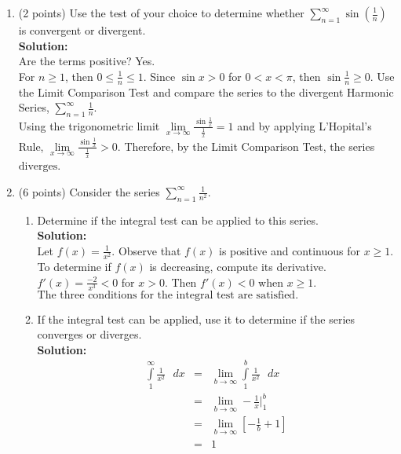\documentclass[paper=a4, fontsize=11pt]{scrartcl} %
\numberwithin{equation}{section} %
\numberwithin{figure}{section} %
\numberwithin{table}{section} %
\begin{document}
\begin{enumerate}
\item (2 points) Use the test of your choice to determine whether 
$\sum\limits_{n=1}^\infty \sin \left( \frac{1}{n} \right)$ is convergent or divergent.\\
\noindent\textbf{Solution:}\\
Are the terms positive? Yes.\\
For $n \ge 1$, then $0 \le \frac{1}{n} \le 1$.  Since $\sin x > 0$ for $0 < x < \pi$, then $\sin \frac{1}{n} \ge 0$. Use the Limit Comparison Test and compare the series to the divergent Harmonic Series, $\sum\limits_{n=1}^\infty \frac{1}{n}$. \\

Using the trigonometric limit $\lim\limits_{x \rightarrow \infty} \frac{\sin \frac{1}{x}}{\frac{1}{x}}=1$ and by applying L'Hopital's Rule,  $\lim\limits_{x \rightarrow \infty} \frac{\sin \frac{1}{x}}{\frac{1}{x}}>0$. Therefore, by the Limit Comparison Test, the series $\boxed{ \text{diverges}}$.


\newpage

\item (6 points) Consider the series $\sum\limits_{n=1}^\infty \frac{1}{n^2}$.
\begin{enumerate}
\item Determine if the integral test can be applied to this series.\\
\noindent\textbf{Solution:}\\
Let $f(x)=\frac{1}{x^2}$. Observe that $f(x)$ is positive and continuous for $x \ge 1$.  To determine if $f(x)$ is decreasing, compute its derivative.  $f'(x)=\frac{-2}{x^3}<0$ for $x>0$.  Then $f'(x)<0$ when $x \ge 1$.  $\boxed{ \text{The three conditions for the integral test are satisfied.}}$
\vspace{.25in}
\item If the integral test can be applied, use it to determine if the series converges or diverges.\\
\noindent\textbf{Solution:}\\
\begin{eqnarray*}
\int\limits_1^\infty \frac{1}{x^2} \text{ } dx & = & \lim\limits_{b \rightarrow \infty} \int\limits_1^b \frac{1}{x^2} \text{ } dx \\
& = & \lim\limits_{b \rightarrow \infty}  -\frac{1}{x} |_1^b \\
& = & \lim\limits_{b \rightarrow \infty} 
\left[ -\frac{1}{b} + 1 \right] \\
& = & 1
\end{eqnarray*}


\end{enumerate}
\end{enumerate}
\end{document}
